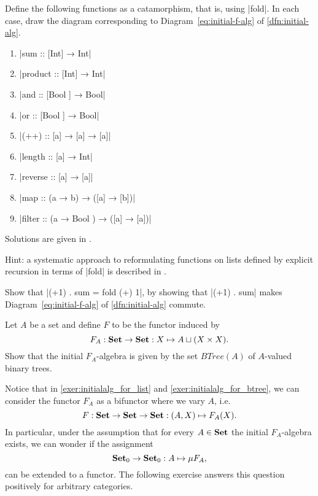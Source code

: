 \begin{exer}\label{exer:list-functions-as-fold}
  Define the following functions as a catamorphism, that is, using |fold|.
  In each case, draw the diagram corresponding to Diagram~\ref{eq:initial-f-alg} of \cref{dfn:initial-alg}.
  \begin{enumerate}
  \item |sum :: [Int] →  Int|
  \item |product :: [Int] →  Int|
  \item |and :: [Bool ] →  Bool|
  \item |or :: [Bool ] →  Bool|
  \item |(++) :: [a] →  [a] →  [a]|
  \item |length :: [a] →  Int|
  \item |reverse :: [a] →  [a]|
  \item |map :: (a →  b) →  ([a] →  [b])|
  \item |filter :: (a →  Bool ) →  ([a] →  [a])|
  \end{enumerate}
  Solutions are given in \cite[\S2]{DBLP:journals/jfp/Hutton99}.

  Hint: a systematic approach to reformulating functions on lists defined by explicit recursion in terms of |fold| is described in \cite[\S3.3]{DBLP:journals/jfp/Hutton99}.
\end{exer}


\begin{exer}
  Show that |(+1) . sum = fold (+) 1|, by showing that |(+1) . sum| makes Diagram~\ref{eq:initial-f-alg} of \cref{dfn:initial-alg} commute.
\end{exer}




\begin{exer}\label{exer:initialalg_for_btree} Let $A$ be a set and define $F$ to be the functor induced by 
\[
F_A:\mathbf{Set}\to\mathbf{Set} : X\mapsto A \sqcup (X\times X).
\]
Show that the initial $F_A$-algebra is given by the set $BTree(A)$ of $A$-valued binary trees.
\end{exer}

\begin{rem} Notice that in \cref{exer:initialalg_for_list} and \cref{exer:initialalg_for_btree}, we can consider the functor $F_A$ as a bifunctor where we vary $A$, i.e.
\[
F: \mathbf{Set}\to \mathbf{Set}\to \mathbf{Set}: (A,X)\mapsto F_A(X).
\]
In particular, under the assumption that for every $A\in\mathbf{Set}$ the initial $F_A$-algebra exists, we can wonder if the assignment 
\[
{\mathbf{Set}}_0 \to {\mathbf{Set}}_0 : A\mapsto \mu F_A ,
\]
can be extended to a functor. The following exercise answers this question positively for arbitrary categories.
\end{rem}

